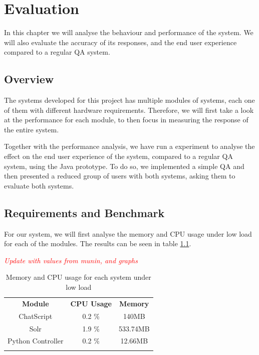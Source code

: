 \chapter{Evaluation}

\begin{chapterintro}

In this chapter we will analyse the behaviour and performance of the system. We will also evaluate the accuracy of its responses, and the end user experience compared to a regular \ac{QA} system.
 
\end{chapterintro}

\cleardoublepage

\section{Overview}

The systems developed for this project has multiple modules of systems, each one of them with different hardware requirements. Therefore, we will first take a look at the performance for each module, to then focus in measuring the response of the entire system.

Together with the performance analysis, we have run a experiment to analyse the effect on the end user experience of the system, compared to a regular \ac{QA} system, using the Java prototype. To do so, we implemented a simple \ac{QA} and then presented a reduced group of users with both systems, asking them to evaluate both systems.

\section{Requirements and Benchmark}

For our system, we will first analyse the memory and CPU usage under low load for each of the modules. The results can be seen in table \ref{tab:loadmeasures}.

\emph{\textcolor{red}{Update with values from munin, and graphs}}
  
\begin{table}
  \centering
  \begin{tabular*}{0.7\textwidth}{| c | c | c |}
    \hhline{|-|-|-|}
    \textbf{Module} & \textbf{CPU Usage} & \textbf{Memory} \\ \hhline{|=|=|=|}
    ChatScript & 0.2 \% &  140MB \\ \hhline{|-|-|-|}
    Solr & 1.9 \% & 533.74MB \\ \hhline{|-|-|-|}
    Python Controller & 0.2 \% & 12.66MB \\ \hhline{|-|-|-|} 
    \end{tabular*}
  \caption{Memory and CPU usage for each system under low load}
  \label{tab:loadmeasures}
\end{table}

